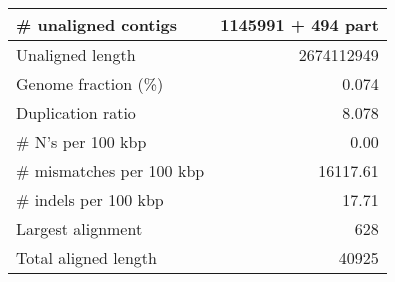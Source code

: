 \documentclass[12pt,a4paper]{article}
\begin{document}
\begin{table}[ht]
\begin{center}
\begin{tabular}{|l*{1}{|r}|}
\# unaligned contigs & 1145991 + 494 part \\ \hline
Unaligned length & 2674112949 \\ \hline
Genome fraction (\%) & 0.074 \\ \hline
Duplication ratio & 8.078 \\ \hline
\# N's per 100 kbp & 0.00 \\ \hline
\# mismatches per 100 kbp & 16117.61 \\ \hline
\# indels per 100 kbp & 17.71 \\ \hline
Largest alignment & 628 \\ \hline
Total aligned length & 40925 \\ \hline
\end{tabular}
\end{center}
\end{table}
\end{document}
